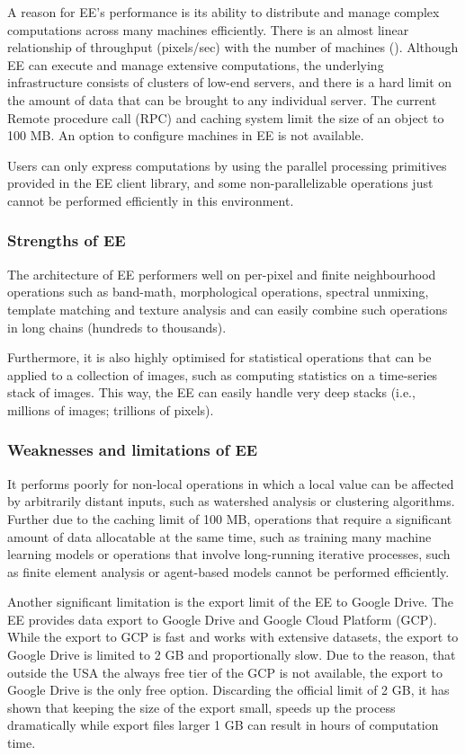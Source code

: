 A reason for EE's performance is its ability to distribute and manage complex computations across many machines efficiently. There is an almost linear relationship of throughput (pixels/sec) with the number of machines (\cite{gorelick2017google}).
Although EE can execute and manage extensive computations, the underlying infrastructure consists of clusters of low-end servers, and there is a hard limit on the amount of data that can be brought to any individual server. The current Remote procedure call (RPC) and caching system limit the size of an object to 100 MB. An option to configure machines in EE is not available.

Users can only express computations by using the parallel processing primitives provided in the EE client library, and some non-parallelizable operations just cannot be performed efficiently in this environment.

\subsubsection{Strengths of EE}

The architecture of EE performers well on per-pixel and finite neighbourhood operations such as band-math, morphological operations, spectral unmixing, template matching and texture analysis and can easily combine such operations in long chains (hundreds to thousands). 

Furthermore, it is also highly optimised for statistical operations
that can be applied to a collection of images, such as computing statistics on a time-series stack of images. This way, the EE can easily handle very deep stacks (i.e., millions of images; trillions of pixels). 

\subsubsection{Weaknesses and limitations of EE}

It performs poorly for non-local operations in which a local value can be affected by arbitrarily distant inputs, such as watershed analysis or clustering algorithms. Further due to the caching limit of 100 MB, operations that require a significant amount of data allocatable at the same time, such as training many machine learning models or operations that involve long-running iterative processes, such as finite element analysis or agent-based models cannot be performed efficiently. 

Another significant limitation is the export limit of the EE to Google Drive.
The EE provides data export to Google Drive and Google Cloud Platform (GCP). While the export to GCP is fast and works with extensive datasets, the export to Google Drive is limited to 2 GB and proportionally slow. Due to the reason, that outside the USA the always free tier of the GCP is not available, the export to Google Drive is the only free option. Discarding the official limit of 2 GB, it has shown that keeping the size of the export small,  speeds up the process dramatically while export files larger 1 GB can result in hours of computation time. 

